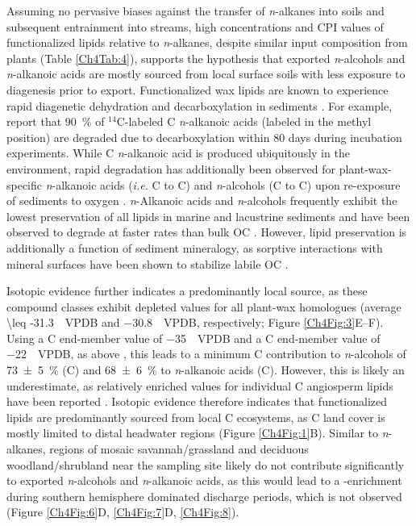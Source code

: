 Assuming no pervasive biases against the transfer of \textit{n}-alkanes into soils and subsequent entrainment into streams, high concentrations and CPI values of functionalized lipids relative to \textit{n}-alkanes, despite similar input composition from plants (Table \ref{Ch4Tab:4}), supports the hypothesis that exported \textit{n}-alcohols and \textit{n}-alkanoic acids are mostly sourced from local surface soils with less exposure to diagenesis prior to export. Functionalized wax lipids are known to experience rapid diagenetic dehydration and decarboxylation in sediments \citep{Meyers:1993up,Sun:1994wj,Canuel:1996ta,Sun:1997wr}. For example, \citet{Sun:1997wr} report that \SI{90}{\%} of $^{14}$C-labeled C \textit{n}-alkanoic acids (labeled in the methyl position) are degraded due to decarboxylation within 80 days during incubation experiments. While C \textit{n}-alkanoic acid is produced ubiquitously in the environment, rapid degradation has additionally been observed for plant-wax-specific \textit{n}-alkanoic acids (\textit{i.e.} C to C) and \textit{n}-alcohols (C to C) upon re-exposure of sediments to oxygen \citep{Hoefs:2002wu}. \textit{n}-Alkanoic acids and \textit{n}-alcohols frequently exhibit the lowest preservation of all lipids in marine and lacustrine sediments and have been observed to degrade at faster rates than bulk OC \citep{Cranwell:1981vg,Meyers:1993vwa}. However, lipid preservation is additionally a function of sediment mineralogy, as sorptive interactions with mineral surfaces have been shown to stabilize labile OC \citep[\textit{e.g.}][]{Keil:1994hb,Mayer:1994wn}.

Isotopic evidence further indicates a predominantly local source, as these compound classes exhibit depleted  values for all plant-wax homologues (average \SI{\leq -31.3}{\permil.VPDB} and \SI{-30.8}{\permil.VPDB}, respectively; Figure \ref{Ch4Fig:3}E--F). Using a C end-member value of \SI{-35}{\permil.VPDB} and a C end-member value of \SI{-22}{\permil.VPDB}, as above \citep{Castaneda:2011jb}, this leads to a minimum C contribution to \textit{n}-alcohols of \SI{73 \pm 5}{\%} (C) and \SI{68 \pm 6}{\%} to \textit{n}-alkanoic acids (C). However, this is likely an underestimate, as relatively enriched  values for individual C angiosperm lipids have been reported \citep[\textit{i.e.} up to \SI{-30}{\permil.VPDB}; ][]{Diefendorf:2011hg,Garcin:2014hg}. Isotopic evidence therefore indicates that functionalized lipids are predominantly sourced from local C ecosystems, as C land cover is mostly limited to distal headwater regions (Figure \ref{Ch4Fig:1}B). Similar to \textit{n}-alkanes, regions of mosaic savannah/grassland and deciduous woodland/shrubland near the sampling site likely do not contribute significantly to exported \textit{n}-alcohols and \textit{n}-alkanoic acids, as this would lead to a -enrichment during southern hemisphere dominated discharge periods, which is not observed (Figure \ref{Ch4Fig:6}D, \ref{Ch4Fig:7}D, \ref{Ch4Fig:8}).

